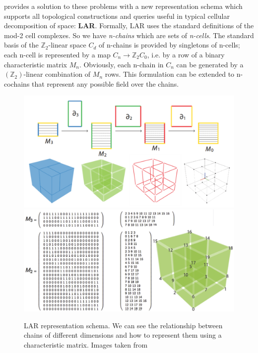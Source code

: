 \cite{DiCarlo} provides a solution to these problems with a new representation schema which supports all topological constructions and queries useful in typical cellular decomposition of space: \textbf{LAR}. Formally, LAR uses the standard definitions of the mod-2 cell complexes. So we have \textit{n-chains} which are sets of \textit{n-cells}. The standard basis of the $\mathbb{Z}_{2}$-linear space $C_{d}$ of n-chains is provided by singletons of n-cells; each n-cell is represented by a map $C_{n} \rightarrow \mathbb{Z}_{2}C_{0}$, i.e. by a row of a binary characteristic matrix $M_{n}$. Obviously, each n-chain in $C_{n}$ can be generated by a $(\mathbb{Z}_{2})$-linear combination of $M_{n}$ rows. This formulation can be extended to n-cochains that represent any possible field over the chains.\\

\begin{figure}[htb] %
   \centering
   \includegraphics[width=0.75\linewidth]{images/larcomplex.pdf}\\
   \includegraphics[width=0.85\linewidth]{images/larRepresentation.png}
   \caption[LAR representation schema]{LAR representation schema. We can see the relationship between chains of different dimensions and how to represent them using a characteristic matrix. Images taken from \cite{DiCarlo}}
   \label{fig:larRepresentation}
\end{figure}

